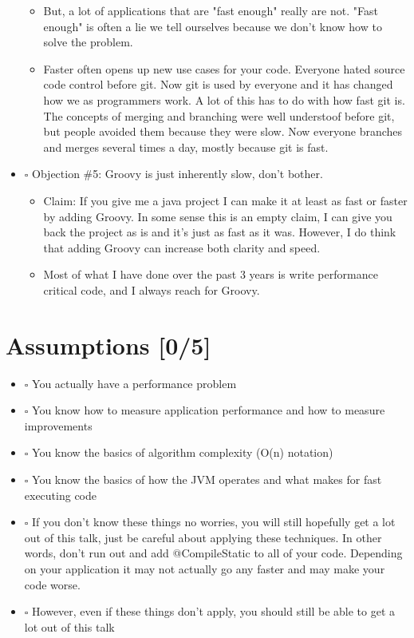 \documentclass[11pt]{article}
\begin{document}
\begin{itemize}
\begin{itemize}
\item But, a lot of applications that are "fast enough" really are not. "Fast enough" is often a lie we tell ourselves because we don't know how to solve the problem.

\item Faster often opens up new use cases for your code. Everyone hated source code control before git. Now git is used by everyone and it has changed how we as programmers work. A lot of this has to do with how fast git is. The concepts of merging and branching were well understoof before git, but people avoided them because they were slow. Now everyone branches and merges several times a day, mostly because git is fast.
\end{itemize}

\item $\square$ Objection \#5: Groovy is just inherently slow, don't bother.

\begin{itemize}
\item Claim: If you give me a java project I can make it at least as fast or faster by adding Groovy. In some sense this is an empty claim, I can give you back the project as is and it's just as fast as it was. However, I do think that adding Groovy can increase both clarity and speed.

\item Most of what I have done over the past 3 years is write performance critical code, and I always reach for Groovy.
\end{itemize}
\end{itemize}

\section{Assumptions [0/5]}
\label{sec:orgheadline3}

\begin{itemize}
\item $\square$ You actually have a performance problem

\item $\square$ You know how to measure application performance and how to measure improvements

\item $\square$ You know the basics of algorithm complexity (O(n) notation)

\item $\square$ You know the basics of how the JVM operates and what makes for fast executing code

\item $\square$ If you don't know these things no worries, you will still hopefully get a lot out of this talk, just be careful about applying these techniques. In other words, don't run out and add @CompileStatic to all of your code. Depending on your application it may not actually go any faster and may make your code worse.

\item $\square$ However, even if these things don't apply, you should still be able to get a lot out of this talk
\end{itemize}
\end{document}

